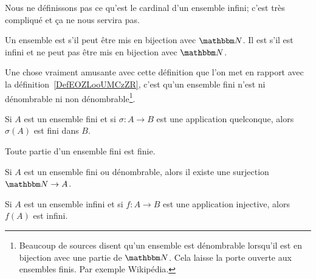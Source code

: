 Nous ne définissons pas ce qu'est le cardinal d'un ensemble infini; c'est très compliqué et ça ne nous servira pas.

\begin{definition}\label{DefEnsembleDenombrable}
    Un ensemble est  s'il peut être mis en bijection avec \( \eN\). Il est  s'il est infini et ne peut pas être mis en bijection avec \( \eN\).
\end{definition}
Une chose vraiment amusante avec cette définition que l'on met en rapport avec la définition~\ref{DefEOZLooUMCzZR}, c'est qu'un ensemble fini n'est ni dénombrable ni non dénombrable\footnote{Beaucoup de sources disent qu'un ensemble est dénombrable lorsqu'il est en bijection avec une partie de \( \eN\). Cela laisse la porte ouverte aux ensembles finis. Par exemple Wikipédia\cite{ooLMVKooUiQUtb}.}.

\begin{lemma}       \label{LEMooGRGFooSWDeMA}
    Si \( A\) est un ensemble fini et si \( \sigma\colon A\to B\) est une application quelconque, alors \( \sigma(A)\) est fini dans \( B\).
\end{lemma}

\begin{lemma}       \label{LEMooTUIRooEXjfDY}
    Toute partie d'un ensemble fini est finie.
\end{lemma}

\begin{lemma}       \label{LEMooSRZWooASgEfy}
    Si \( A\) est un ensemble fini ou dénombrable, alors il existe une surjection \( \eN\to A\).
\end{lemma}

\begin{lemma}        \label{LEMooXPSQooRaSrxv}
    Si \( A\) est un ensemble infini et si \( f\colon A\to B\) est une application injective, alors \( f(A)\) est infini.
\end{lemma}

